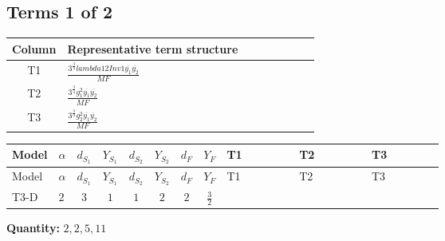 \documentclass[8pt]{article}
\begin{document}
\begin{landscape}
\subsection*{Terms 1 of 2}
\begin{center}
\begin{tabular}{@{}c >{\raggedright\arraybackslash}p{0.82\linewidth}@{}}
\toprule
Column & Representative term structure \\
\midrule
T1 & \(\displaystyle \frac{3^{\frac{3}{4}} lambda12Inv1 \overline{y_{1}} \overline{y_{2}}}{MF}\) \\
\midrule
T2 & \(\displaystyle \frac{3^{\frac{3}{4}} g_{1}^{2} \overline{y_{1}} \overline{y_{2}}}{MF}\) \\
\midrule
T3 & \(\displaystyle \frac{3^{\frac{3}{4}} g_{2}^{2} \overline{y_{1}} \overline{y_{2}}}{MF}\) \\
\midrule
\bottomrule
\end{tabular}
\end{center}
\smallskip
\tiny
\begin{longtable}{@{}llcccccc >{\raggedright\arraybackslash}p{0.21\linewidth} >{\raggedright\arraybackslash}p{0.21\linewidth} >{\raggedright\arraybackslash}p{0.21\linewidth}@{}}
\toprule
Model & $\alpha$ & $d_{S_1}$ & $Y_{S_1}$ & $d_{S_2}$ & $Y_{S_2}$ & $d_F$ & $Y_F$ & T1 & T2 & T3 \\
\midrule
\endfirsthead
\toprule
Model & $\alpha$ & $d_{S_1}$ & $Y_{S_1}$ & $d_{S_2}$ & $Y_{S_2}$ & $d_F$ & $Y_F$ & T1 & T2 & T3 \\
\midrule
\endhead
T3-D & $2$ & $3$ & $1$ & $1$ & $2$ & $2$ & $\frac{3}{2}$ & \scriptsize\adjustbox{max width=\linewidth}{$\begin{gathered} \frac{3^{\frac{3}{4}} lambda12Inv1 \overline{y_{1}} \overline{y_{2}}}{6 MF}\end{gathered}$} & \scriptsize\adjustbox{max width=\linewidth}{$\begin{gathered} \frac{9 \cdot 3^{\frac{3}{4}} g_{1}^{2} \overline{y_{1}} \overline{y_{2}}}{8 MF}\end{gathered}$} & \scriptsize\adjustbox{max width=\linewidth}{$\begin{gathered} \frac{11 \cdot 3^{\frac{3}{4}} g_{2}^{2} \overline{y_{1}} \overline{y_{2}}}{8 MF}\end{gathered}$} \\
\midrule
\bottomrule
\end{longtable}
\clearpage
\noindent\textbf{Quantity: }$\mathrm{2,2,5,11}$\par\smallskip

\end{landscape}
\end{document}
